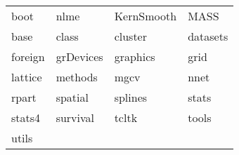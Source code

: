 \begin{tabular}{llll} 
boot & nlme & KernSmooth & MASS\\ 
base & class & cluster & datasets\\ 
foreign & grDevices & graphics & grid\\ 
lattice & methods & mgcv & nnet\\ 
rpart & spatial & splines & stats\\ 
stats4 & survival & tcltk & tools\\ 
utils  &   &   &   \\ 
\end{tabular}

